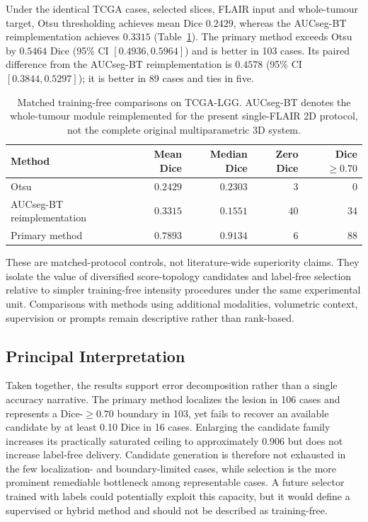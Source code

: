 \documentclass[11pt,a4paper]{article}
\begin{document}
Under the identical TCGA cases, selected slices, FLAIR input and whole-tumour
target, Otsu thresholding achieves mean Dice $0.2429$, whereas the AUCseg-BT
reimplementation achieves $0.3315$ (Table~\ref{tab:baselines}). The primary
method exceeds Otsu by $0.5464$ Dice (95\% CI $[0.4936,0.5964]$) and is better
in 103 cases. Its paired difference from the AUCseg-BT reimplementation is
$0.4578$ (95\% CI $[0.3844,0.5297]$); it is better in 89 cases and ties in five.

\begin{table}[htbp]\centering
\caption{Matched training-free comparisons on TCGA-LGG. AUCseg-BT denotes the
whole-tumour module reimplemented for the present single-FLAIR 2D protocol, not
the complete original multiparametric 3D system.}\label{tab:baselines}
\begin{tabular}{lrrrr}
\toprule
Method & Mean Dice & Median Dice & Zero Dice & Dice $\ge0.70$ \\
\midrule
Otsu & $0.2429$ & $0.2303$ & $3$ & $0$ \\
AUCseg-BT reimplementation & $0.3315$ & $0.1551$ & $40$ & $34$ \\
Primary method & $0.7893$ & $0.9134$ & $6$ & $88$ \\
\bottomrule
\end{tabular}
\end{table}

These are matched-protocol controls, not literature-wide superiority claims.
They isolate the value of diversified score-topology candidates and label-free
selection relative to simpler training-free intensity procedures under the same
experimental unit. Comparisons with methods using additional modalities,
volumetric context, supervision or prompts remain descriptive rather than
rank-based.

\subsection{Principal Interpretation}\label{sec:principal-interpretation}

Taken together, the results support error decomposition rather than a single
accuracy narrative. The primary method localizes the lesion in 106 cases and
represents a Dice-$\ge0.70$ boundary in 103, yet fails to recover an available
candidate by at least 0.10 Dice in 16 cases. Enlarging the candidate family
increases its practically saturated ceiling to approximately $0.906$ but does not
increase label-free delivery. Candidate generation is therefore not exhausted in
the few localization- and boundary-limited cases, while selection is the more
prominent remediable bottleneck among representable cases. A future selector
trained with labels could potentially exploit this capacity, but it would define
a supervised or hybrid method and should not be described as training-free.
\end{document}
